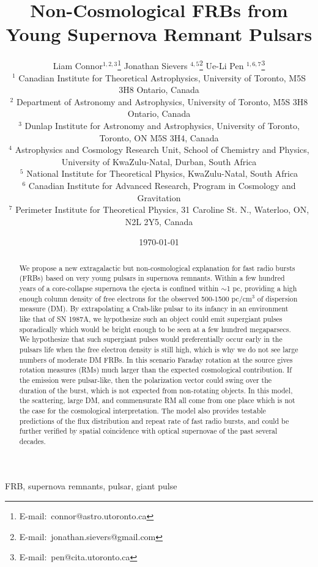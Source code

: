 \documentclass[useAMS,usenatbib]{mn2e}
\title{Non-Cosmological FRBs from Young Supernova Remnant Pulsars}
\author[Connor et al.]{
Liam Connor$^{1,2,3}$\thanks{E-mail:\ connor@astro.utoronto.ca}
Jonathan Sievers $^{4, 5}$\thanks{E-mail:\ jonathan.sievers@gmail.com}
Ue-Li Pen $^{1, 6, 7}$\thanks{E-mail:\ pen@cita.utoronto.ca}
\\
$^1$ Canadian Institute for Theoretical Astrophysics, University of Toronto, M5S 3H8 Ontario, Canada
\\
$^2$ Department of Astronomy and Astrophysics, University of Toronto, 
M5S 3H8 Ontario, Canada
\\
$^3$ Dunlap Institute for Astronomy and Astrophysics, University of Toronto,
Toronto, ON M5S 3H4, Canada
\\
$^4$ Astrophysics and Cosmology Research Unit, School of Chemistry and Physics, University of KwaZulu-Natal, Durban, South Africa
\\
$^5$ National Institute for Theoretical Physics, KwaZulu-Natal, South Africa
\\
$^6$ Canadian Institute for Advanced Research, Program in Cosmology
and Gravitation
\\
$^7$ Perimeter Institute for Theoretical Physics, 31 Caroline St. N., Waterloo, ON, N2L 2Y5, Canada
}
\begin{document}
\date{\today}
\pagerange{\pageref{firstpage}--\pageref{lastpage}} 
\maketitle
\label{firstpage}

\begin{abstract}
We  propose a new extragalactic but non-cosmological explanation for fast radio bursts 
(FRBs) based on
very young pulsars in supernova remnants. Within a few hundred years of a 
core-collapse supernova the ejecta 
is confined within $\sim$1 pc, providing a high enough column density of free electrons 
for the observed 500-1500 pc/cm$^3$ of dispersion measure (DM). By extrapolating a Crab-like pulsar to 
its infancy in an environment like that of SN 1987A, 
we hypothesize such an object could emit supergiant pulses sporadically which 
would be bright enough to be seen at a few hundred megaparsecs. We hypothesize that
such supergiant pulses would preferentially occur early in the pulsars life when the 
free electron density is still high, which is why we do not see large numbers of 
moderate DM FRBs. 
In this scenario Faraday
rotation at the source gives rotation measures (RMs) much larger than the expected
cosmological contribution.  If the emission were pulsar-like, then the polarization 
vector could swing over the duration of the burst, which is not expected from 
non-rotating objects.
In this model, the scattering,
large DM, and commensurate RM all come from one place which is not the case for the cosmological
interpretation. The model also provides
testable predictions of the flux distribution and repeat rate of fast radio bursts, and could be further
verified by spatial coincidence with optical supernovae of the past several decades. 
\end{abstract}
\begin{keywords}
FRB, supernova remnants, pulsar, giant pulse
\end{keywords}

\end{document}
